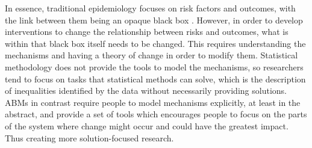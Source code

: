 \documentclass[review]{elsarticle}
\begin{document}
In essence, traditional epidemiology focuses on risk factors and outcomes, with the link between them being an opaque black box \citep{susser1996}. However, in order to develop interventions to change the relationship between risks and outcomes, what is within that black box itself needs to be changed. This requires understanding the mechanisms and having a theory of change in order to modify them. Statistical methodology does not provide the tools to model the mechanisms, so researchers tend to focus on tasks that statistical methods can solve, which is the description of inequalities identified by the data without necessarily providing solutions. ABMs in contrast require people to model mechanisms explicitly, at least in the abstract, and provide a set of tools which encourages people to focus on the parts of the system where change might occur and could have the greatest impact. Thus creating more solution-focused research.
% 
% 
\end{document}
